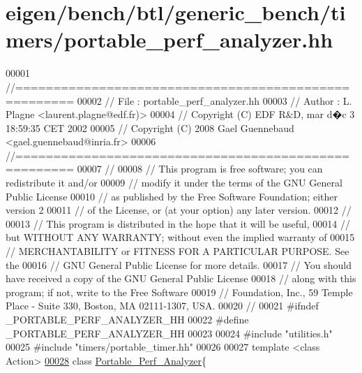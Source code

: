 \hypertarget{eigen_2bench_2btl_2generic__bench_2timers_2portable__perf__analyzer_8hh_source}{}\section{eigen/bench/btl/generic\+\_\+bench/timers/portable\+\_\+perf\+\_\+analyzer.hh}
\label{eigen_2bench_2btl_2generic__bench_2timers_2portable__perf__analyzer_8hh_source}

\begin{DoxyCode}
00001 \textcolor{comment}{//=====================================================}
00002 \textcolor{comment}{// File   :  portable\_perf\_analyzer.hh}
00003 \textcolor{comment}{// Author :  L. Plagne <laurent.plagne@edf.fr)>}
00004 \textcolor{comment}{// Copyright (C) EDF R&D,  mar d�c 3 18:59:35 CET 2002}
00005 \textcolor{comment}{// Copyright (C) 2008 Gael Guennebaud <gael.guennebaud@inria.fr>}
00006 \textcolor{comment}{//=====================================================}
00007 \textcolor{comment}{//}
00008 \textcolor{comment}{// This program is free software; you can redistribute it and/or}
00009 \textcolor{comment}{// modify it under the terms of the GNU General Public License}
00010 \textcolor{comment}{// as published by the Free Software Foundation; either version 2}
00011 \textcolor{comment}{// of the License, or (at your option) any later version.}
00012 \textcolor{comment}{//}
00013 \textcolor{comment}{// This program is distributed in the hope that it will be useful,}
00014 \textcolor{comment}{// but WITHOUT ANY WARRANTY; without even the implied warranty of}
00015 \textcolor{comment}{// MERCHANTABILITY or FITNESS FOR A PARTICULAR PURPOSE.  See the}
00016 \textcolor{comment}{// GNU General Public License for more details.}
00017 \textcolor{comment}{// You should have received a copy of the GNU General Public License}
00018 \textcolor{comment}{// along with this program; if not, write to the Free Software}
00019 \textcolor{comment}{// Foundation, Inc., 59 Temple Place - Suite 330, Boston, MA  02111-1307, USA.}
00020 \textcolor{comment}{//}
00021 \textcolor{preprocessor}{#ifndef \_PORTABLE\_PERF\_ANALYZER\_HH}
00022 \textcolor{preprocessor}{#define \_PORTABLE\_PERF\_ANALYZER\_HH}
00023 
00024 \textcolor{preprocessor}{#include "utilities.h"}
00025 \textcolor{preprocessor}{#include "timers/portable\_timer.hh"}
00026 
00027 \textcolor{keyword}{template} <\textcolor{keyword}{class} Action>
\hyperlink{class_portable___perf___analyzer}{00028} \textcolor{keyword}{class }\hyperlink{class_portable___perf___analyzer}{Portable\_Perf\_Analyzer}\{

\end{DoxyCode}
